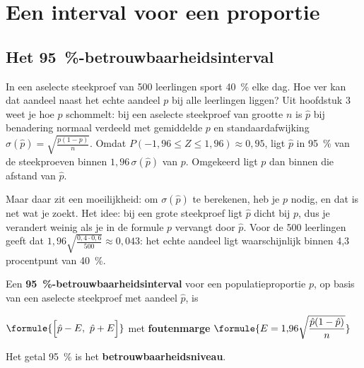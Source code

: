 \begin{oefeningen}[Start]

\end{oefeningen}

\section{Een interval voor een proportie}

\subsection{Het 95~\%-betrouwbaarheidsinterval}

In een aselecte steekproef van 500 leerlingen sport 40~\% elke dag. Hoe ver kan dat aandeel naast het echte aandeel $p$ bij alle leerlingen liggen? Uit hoofdstuk 3 weet je hoe $\hat{p}$ schommelt: bij een aselecte steekproef van grootte $n$ is $\hat{p}$ bij benadering normaal verdeeld met gemiddelde $p$ en standaardafwijking $\sigma(\hat{p}) = \sqrt{\frac{p(1 - p)}{n}}$. Omdat $P(-1{,}96 \leqslant Z \leqslant 1{,}96) \approx 0{,}95$, ligt $\hat{p}$ in 95~\% van de steekproeven binnen $1{,}96\,\sigma(\hat{p})$ van $p$. Omgekeerd ligt $p$ dan binnen die afstand van $\hat{p}$.

Maar daar zit een moeilijkheid: om $\sigma(\hat{p})$ te berekenen, heb je $p$ nodig, en dat is net wat je zoekt. Het idee: bij een grote steekproef ligt $\hat{p}$ dicht bij $p$, dus je verandert weinig als je in de formule $p$ vervangt door $\hat{p}$. Voor de 500 leerlingen geeft dat $1{,}96\sqrt{\frac{0{,}4 \cdot 0{,}6}{500}} \approx 0{,}043$: het echte aandeel ligt waarschijnlijk binnen 4,3 procentpunt van 40~\%.

\begin{theorie}
Een \textbf{\textcolor{accent}{95~\%-betrouwbaarheidsinterval}} voor een populatieproportie $p$, op basis van een aselecte steekproef met aandeel $\hat{p}$, is

\vspace{1mm}
\qquad $\formule{\Bigl[\hat{p} - E,\ \hat{p} + E\Bigr]}$ \quad met \textbf{\textcolor{accent}{foutenmarge}} \quad $\formule{E = 1{,}96 \sqrt{\dfrac{\hat{p}(1 - \hat{p})}{n}}}$

\vspace{1mm}
Het getal 95~\% is het \textbf{\textcolor{accent}{betrouwbaarheidsniveau}}.
\end{theorie}

